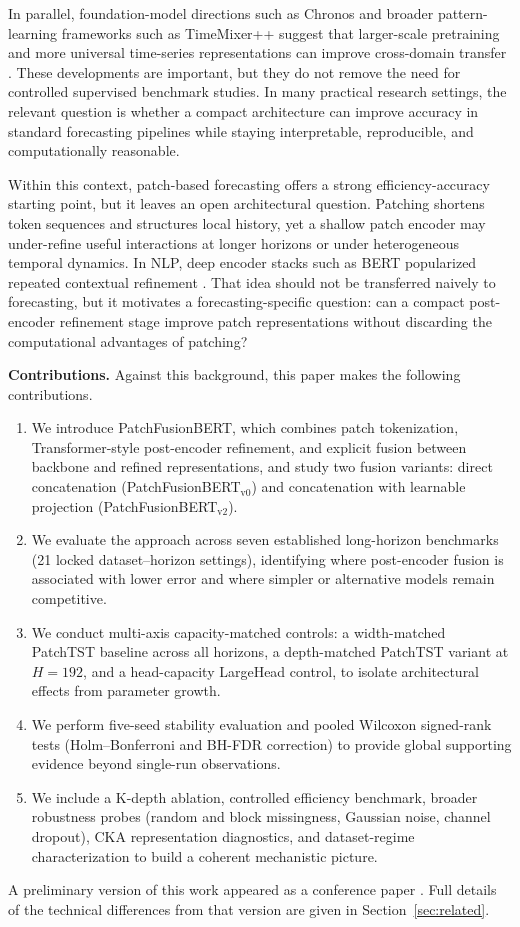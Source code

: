 \documentclass{ieeeaccess}
\newcommand{\model}{PatchFusionBERT\xspace}
\newcommand{\modelvzero}{PatchFusionBERT$_{\text{v0}}$\xspace}
\newcommand{\modelvtwo}{PatchFusionBERT$_{\text{v2}}$\xspace}
\begin{document}
In parallel, foundation-model directions such as Chronos and broader pattern-learning
frameworks such as TimeMixer++ suggest that larger-scale pretraining and more universal
time-series representations can improve cross-domain transfer
\cite{ansari2024chronos,timemixerpp2025}. These developments are important, but they
do not remove the need for controlled supervised benchmark studies. In many practical
research settings, the relevant question is whether a compact architecture can improve
accuracy in standard forecasting pipelines while staying interpretable, reproducible,
and computationally reasonable.

Within this context, patch-based forecasting offers a strong efficiency-accuracy
starting point, but it leaves an open architectural question. Patching shortens token
sequences and structures local history, yet a shallow patch encoder may under-refine
useful interactions at longer horizons or under heterogeneous temporal dynamics. In
NLP, deep encoder stacks such as BERT popularized repeated contextual refinement
\cite{devlin2019bert}. That idea should not be transferred naively to forecasting,
but it motivates a forecasting-specific question: can a compact post-encoder
refinement stage improve patch representations without discarding the computational
advantages of patching?

\textbf{Contributions.} Against this background, this paper makes the following
contributions.
\begin{enumerate}
\item We introduce \model, which combines patch tokenization, Transformer-style
post-encoder refinement, and explicit fusion between backbone and refined
representations, and study two fusion variants: direct concatenation (\modelvzero) and
concatenation with learnable projection (\modelvtwo).
\item We evaluate the approach across seven established long-horizon benchmarks
(21 locked dataset--horizon settings), identifying where post-encoder fusion is
associated with lower error and where simpler or alternative models remain competitive.
\item We conduct multi-axis capacity-matched controls: a width-matched PatchTST
baseline across all horizons, a depth-matched PatchTST variant at $H=192$, and a
head-capacity LargeHead control, to isolate architectural effects from parameter growth.
\item We perform five-seed stability evaluation and pooled Wilcoxon signed-rank tests
(Holm--Bonferroni and BH-FDR correction) to provide global supporting evidence
beyond single-run observations.
\item We include a K-depth ablation, controlled efficiency benchmark, broader
robustness probes (random and block missingness, Gaussian noise, channel dropout),
CKA representation diagnostics, and dataset-regime characterization to build
a coherent mechanistic picture.
\end{enumerate}
A preliminary version of this work appeared as a conference paper
\cite{ahmad2024icamcs_patchbert}. Full details of the technical differences from that
version are given in
Section~\ref{sec:related}.
\end{document}
